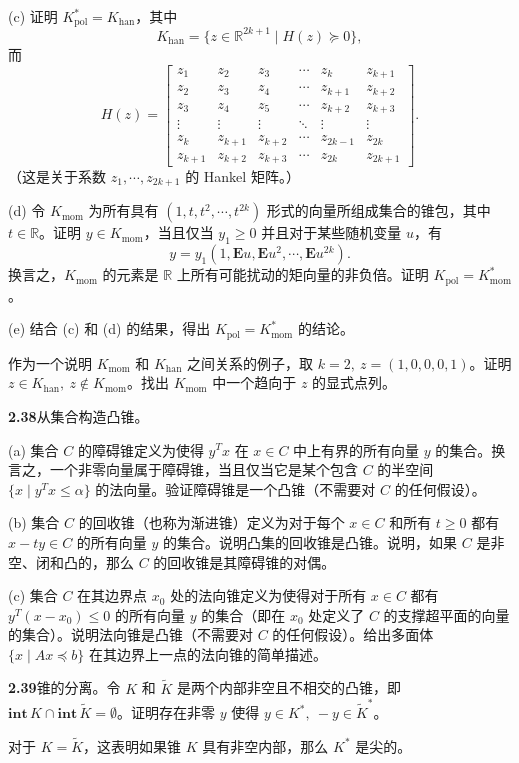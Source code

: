 \documentclass[UTF8, 12pt, fontset=fandol, oneside]{ctexart}
\begin{document}
\noindent(c) 证明 $K_{\mathrm{pol}}^*=K_{\mathrm{han}}$，其中
\[
  K_{\mathrm{han}}=\{z\in\mathbb{R}^{2k+1}\mid H(z)\succeq0\},
\]
而
\[
  H(z)=
  \begin{bmatrix}
  z_1 & z_2 & z_3 & \cdots & z_k & z_{k+1}\\
  z_2 & z_3 & z_4 & \cdots & z_{k+1} & z_{k+2}\\
  z_3 & z_4 & z_5 & \cdots & z_{k+2} & z_{k+3}\\
  \vdots & \vdots & \vdots & \ddots & \vdots & \vdots\\
  z_k & z_{k+1} & z_{k+2} & \cdots & z_{2k-1} & z_{2k}\\
  z_{k+1} & z_{k+2} & z_{k+3} & \cdots & z_{2k} & z_{2k+1}
  \end{bmatrix}.
\]
（这是关于系数 $z_1,\cdots,z_{2k+1}$ 的 Hankel 矩阵。）

\noindent(d) 令 $K_{\mathrm{mom}}$ 为所有具有 $(1,t,t^2,\cdots,t^{2k})$ 形式的向量所组成集合的锥包，其中 $t\in\mathbb{R}$。证明 $y\in K_{\mathrm{mom}}$，当且仅当 $y_1\ge0$ 并且对于某些随机变量 $u$，有
\[
  y=y_1(1,\mathbf{E}u,\mathbf{E}u^2,\cdots,\mathbf{E}u^{2k}).
\]
换言之，$K_{\mathrm{mom}}$ 的元素是 $\mathbb{R}$ 上所有可能扰动的矩向量的非负倍。证明 $K_{\mathrm{pol}}=K_{\mathrm{mom}}^*$。

\noindent(e) 结合 (c) 和 (d) 的结果，得出 $K_{\mathrm{pol}}=K_{\mathrm{mom}}^*$ 的结论。

作为一个说明 $K_{\mathrm{mom}}$ 和 $K_{\mathrm{han}}$ 之间关系的例子，取 $k=2,\ z=(1,0,0,0,1)$。证明 $z\in K_{\mathrm{han}},\ z\notin K_{\mathrm{mom}}$。找出 $K_{\mathrm{mom}}$ 中一个趋向于 $z$ 的显式点列。

\noindent\textbf{2.38}\quad [Roc70，第 15, 61 页] 从集合构造凸锥。

\noindent(a) 集合 $C$ 的障碍锥定义为使得 $y^Tx$ 在 $x\in C$ 中上有界的所有向量 $y$ 的集合。换言之，一个非零向量属于障碍锥，当且仅当它是某个包含 $C$ 的半空间 $\{x\mid y^Tx\le\alpha\}$ 的法向量。验证障碍锥是一个凸锥（不需要对 $C$ 的任何假设）。

\noindent(b) 集合 $C$ 的回收锥（也称为渐进锥）定义为对于每个 $x\in C$ 和所有 $t\ge0$ 都有 $x-ty\in C$ 的所有向量 $y$ 的集合。说明凸集的回收锥是凸锥。说明，如果 $C$ 是非空、闭和凸的，那么 $C$ 的回收锥是其障碍锥的对偶。

\noindent(c) 集合 $C$ 在其边界点 $x_0$ 处的法向锥定义为使得对于所有 $x\in C$ 都有 $y^T(x-x_0)\le0$ 的所有向量 $y$ 的集合（即在 $x_0$ 处定义了 $C$ 的支撑超平面的向量的集合）。说明法向锥是凸锥（不需要对 $C$ 的任何假设）。给出多面体 $\{x\mid Ax\preceq b\}$ 在其边界上一点的法向锥的简单描述。

\noindent\textbf{2.39}\quad 锥的分离。令 $K$ 和 $\tilde{K}$ 是两个内部非空且不相交的凸锥，即 $\mathbf{int}\,K\cap\mathbf{int}\,\tilde{K}=\emptyset$。证明存在非零 $y$ 使得 $y\in K^*,\ -y\in\tilde{K}^*$。

对于 $K=\tilde{K}$，这表明如果锥 $K$ 具有非空内部，那么 $K^*$ 是尖的。
\end{document}
